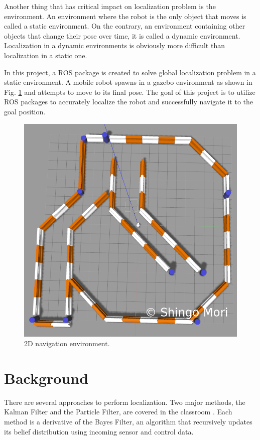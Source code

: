 \documentclass[10pt,journal,compsoc]{IEEEtran}
\begin{document}
Another thing that has critical impact on localization problem is the environment. An environment where the robot is the only object that moves is called a static environment. On the contrary, an environment containing other objects that change their pose over time, it is called a dynamic environment. Localization in a dynamic environments is obviously more difficult than localization in a static one.

In this project, a ROS package is created to solve global localization problem in a static environment. A  mobile robot spawns in a gazebo environment as shown in Fig. \ref{fig:environment} and attempts to move to its final pose. The goal of this project is to utilize ROS packages to accurately localize the robot and successfully navigate it to the goal position.

\begin{figure}[thpb]
      \centering
      \includegraphics[width=\linewidth]{gazebo-map}
      \caption{2D navigation environment.}
      \label{fig:environment}
\end{figure}

\section{Background}
There are several approaches to perform localization. Two major methods, the Kalman Filter and the Particle Filter, are covered in the classroom \cite{Udacity:nd209}. Each method is a derivative of the Bayes Filter, an algorithm that recursively updates its belief distribution using incoming sensor and control data.
\end{document}
